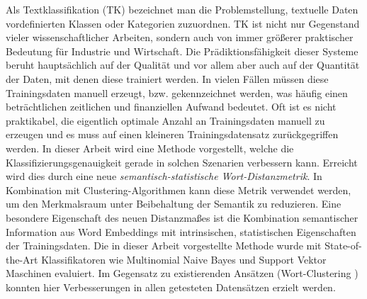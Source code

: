 
\Abstract

Als Textklassifikation (TK) bezeichnet man die Problemstellung, textuelle Daten vordefinierten Klassen oder Kategorien zuzuordnen. 
TK ist nicht nur Gegenstand vieler wissenschaftlicher Arbeiten, sondern auch von immer größerer praktischer Bedeutung 
für Industrie und Wirtschaft. Die Prädiktionsfähigkeit dieser Systeme beruht hauptsächlich auf der Qualität und vor allem aber auch 
auf der Quantität der Daten, mit denen diese trainiert werden. In vielen Fällen müssen diese Trainingsdaten manuell erzeugt, bzw.
gekennzeichnet werden, was häufig einen beträchtlichen zeitlichen und finanziellen Aufwand bedeutet.  
Oft ist es nicht praktikabel, die eigentlich optimale Anzahl an Trainingsdaten manuell zu erzeugen und es muss
auf einen kleineren Trainingsdatensatz zurückgegriffen werden. In dieser Arbeit wird eine Methode vorgestellt, 
welche die Klassifizierungsgenauigkeit gerade in solchen Szenarien verbessern kann. 
Erreicht wird dies durch eine neue \emph{semantisch-statistische Wort-Distanzmetrik}.
In Kombination mit Clustering-Algorithmen kann diese Metrik verwendet werden, um den Merkmalsraum unter 
Beibehaltung der Semantik zu reduzieren.  Eine besondere Eigenschaft des neuen Distanzmaßes ist die Kombination semantischer 
Information aus Word Embeddings \cite{mikolov2013distributed} mit intrinsischen, statistischen Eigenschaften der Trainingsdaten. Die in dieser Arbeit vorgestellte 
 Methode wurde mit State-of-the-Art Klassifikatoren wie Multinomial Naive Bayes und Support Vektor Maschinen evaluiert. Im Gegensatz zu 
 existierenden Ansätzen (Wort-Clustering \cite{baker1998distributional, ma2015using}) konnten hier Verbesserungen in allen getesteten Datensätzen erzielt werden.
